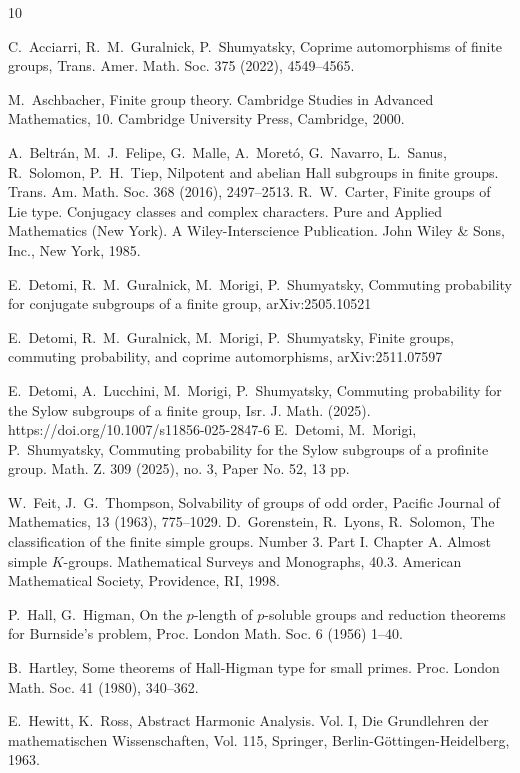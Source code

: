 \documentclass[12pt]{amsart}
\begin{document}
\begin{thebibliography}{10}

  C.~Acciarri, R.~M.~Guralnick, P.~Shumyatsky, Coprime automorphisms of finite
groups, Trans. Amer. Math. Soc. 375 (2022), 4549--4565.

 M.~Aschbacher,  Finite group theory.  
Cambridge Studies in Advanced Mathematics, 10. Cambridge University Press, Cambridge, 2000.

 A.~Beltr\'an, M.~J.~Felipe, G.~Malle,
A.~Moret\'o, G.~Navarro, L.~Sanus, R.~Solomon, P.~H.~Tiep, Nilpotent
and abelian Hall subgroups in finite groups. Trans. Am. Math. Soc.
368 (2016), 2497–2513.
  R.~W.~Carter, Finite groups of Lie type. Conjugacy classes and complex characters. Pure and Applied Mathematics (New York). A Wiley-Interscience Publication. John Wiley \& Sons, Inc., New York, 1985.

 E.~Detomi, R.~M.~Guralnick, M.~Morigi, P.~Shumyatsky,   Commuting probability for conjugate subgroups of a finite group,  	arXiv:2505.10521

  E.~Detomi, R.~M.~Guralnick, M.~Morigi, P.~Shumyatsky,      Finite groups, commuting probability, and coprime automorphisms,  	arXiv:2511.07597 

  E.~Detomi, A.~Lucchini, M.~Morigi, P.~Shumyatsky,  Commuting probability for the Sylow subgroups of a finite group, 	 Isr. J. Math. (2025). https://doi.org/10.1007/s11856-025-2847-6
 E.~Detomi, M.~Morigi, P.~Shumyatsky,  Commuting probability for the Sylow subgroups of a profinite group. Math. Z. 309 (2025), no. 3, Paper No. 52, 13 pp. 

 W.~Feit, J.~G.~Thompson, Solvability of groups of odd order, Pacific Journal of Mathematics, 13 (1963), 775--1029.
  D.~Gorenstein, R.~Lyons, R.~Solomon, The classification of the finite simple groups. Number 3. Part I. Chapter A. Almost simple $K$-groups. Mathematical Surveys and Monographs, 40.3. American Mathematical Society, Providence, RI, 1998.

  P.~Hall, G.~Higman, On the $p$-length of $p$-soluble groups and reduction
theorems for Burnside's problem, Proc. London Math. Soc. 6 (1956) 1--40.

 B.~Hartley, 
Some theorems of Hall-Higman type for small primes.
Proc. London Math. Soc.  41 (1980), 340--362.

 E.~Hewitt, K.~Ross, Abstract Harmonic Analysis. Vol. I, Die Grundlehren der mathematischen Wissenschaften, Vol. 115, Springer, Berlin-G\"{o}ttingen-Heidelberg, 1963. 


\end{thebibliography}
\end{document}
